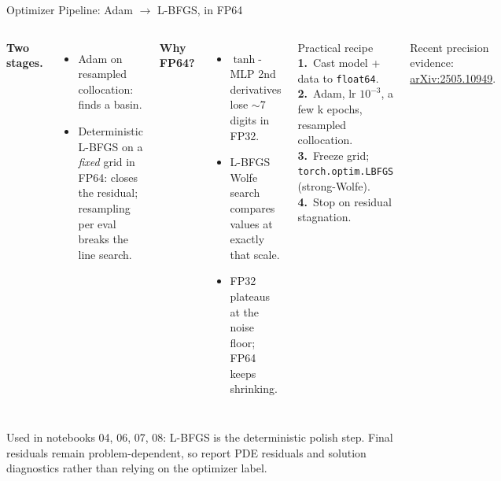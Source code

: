 \documentclass[aspectratio=169,11pt]{beamer}
\newcommand{\emphc}[1]{\textcolor{harvardcrimson}{#1}}
\begin{document}
\begin{frame}[shrink=8]{Optimizer Pipeline: Adam $\to$ L-BFGS, in FP64}
\small
\begin{columns}[T]
\textbf{Two stages.}
\begin{itemize}\itemsep0pt
    \item \emphc{Adam} on resampled collocation: finds a basin.
    \item \emphc{Deterministic L-BFGS} on a \emph{fixed} grid in FP64: closes the residual; resampling per eval breaks the line search.
\end{itemize}

\vspace{0.3em}
\textbf{Why FP64?}
\begin{itemize}\itemsep0pt
    \item $\tanh$-MLP 2nd derivatives lose $\sim$7 digits in FP32.
    \item L-BFGS Wolfe search compares values at exactly that scale.
    \item FP32 plateaus at the noise floor; FP64 keeps shrinking.
\end{itemize}

\begin{block}{Practical recipe}
\footnotesize
\textbf{1.}~Cast model + data to \texttt{float64}.\\
\textbf{2.}~Adam, lr $10^{-3}$, a few k epochs, resampled collocation.\\
\textbf{3.}~Freeze grid; \texttt{torch.optim.LBFGS} (strong-Wolfe).\\
\textbf{4.}~Stop on residual stagnation.
\end{block}
{\footnotesize Recent precision evidence: \href{https://arxiv.org/abs/2505.10949}{arXiv:2505.10949}.}
\end{columns}

\vspace{0.2em}
{\footnotesize \emphc{Used in notebooks 04, 06, 07, 08:} L-BFGS is the deterministic polish step.  Final residuals remain problem-dependent, so report PDE residuals and solution diagnostics rather than relying on the optimizer label.}
\end{frame}
\end{document}
